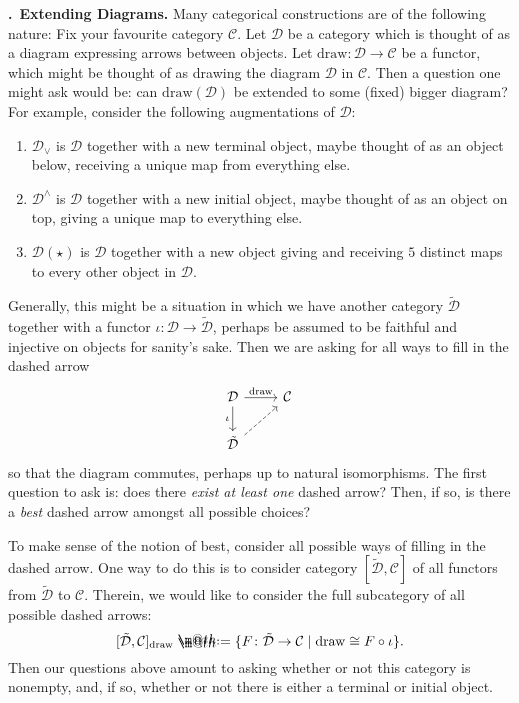 \documentclass[11pt, noamsfonts]{amsart}
\makeatletter
\newcommand{\pointheader}{\vspace{2mm}\noindent\refstepcounter{section}\textbf{\thesection.}}
\newcommand{\bpoint}[1]{\pointheader~{\bf #1.}}
\newcommand*{\coloneqq}{\mathrel{\rlap{%
           \raisebox{0.3ex}{$\m@th\cdot$}}%
           \raisebox{-0.3ex}{$\m@th\cdot$}}%
           =}
\makeatother
\begin{document}
\bpoint{Extending Diagrams}
Many categorical constructions are of the following nature: Fix your favourite
category \(\mathcal{C}\). Let \(\mathcal{D}\) be a category which is thought
of as a diagram expressing arrows between objects. Let
\(\mathrm{draw} \colon \mathcal{D} \to \mathcal{C}\) be a functor, which might
be thought of as drawing the diagram \(\mathcal{D}\) in \(\mathcal{C}\). Then
a question one might ask would be: can \(\mathrm{draw}(\mathcal{D})\) be
extended to some (fixed) bigger diagram? For example, consider the following
augmentations of \(\mathcal{D}\):
\begin{enumerate}
\item \(\mathcal{D}_\vee\) is \(\mathcal{D}\) together with a new terminal
object, maybe thought of as an object below, receiving a unique map from everything else.
\item \(\mathcal{D}^\wedge\) is \(\mathcal{D}\) together with a new initial
object, maybe thought of as an object on top, giving a unique map to everything else.
\item \(\mathcal{D}(\star)\) is \(\mathcal{D}\) together with a new object
giving and receiving \(5\) distinct maps to every other object in \(\mathcal{D}\).
\end{enumerate}
Generally, this might be a situation in which we have another category
\(\tilde{\mathcal{D}}\) together with a functor
\(\iota \colon \mathcal{D} \to \tilde{\mathcal{D}}\), perhaps be assumed to be
faithful and injective on objects for sanity's sake. Then we are asking for all
ways to fill in the dashed arrow
\[
\begin{tikzcd}
\mathcal{D} \rar["\mathrm{draw}"] \dar["\iota"'] & \mathcal{C} \\
\tilde{\mathcal{D}} \ar[dashed,ur]
\end{tikzcd}
\]
so that the diagram commutes, perhaps up to natural isomorphisms. The first
question to ask is: does there \emph{exist at least one} dashed arrow? Then, if
so, is there a \emph{best} dashed arrow amongst all possible choices?

To make sense of the notion of best, consider all possible ways of filling
in the dashed arrow. One way to do this is to consider category
\([\tilde{\mathcal{D}}, \mathcal{C}]\) of all functors from \(\tilde{\mathcal{D}}\)
to \(\mathcal{C}\). Therein, we would like to consider the full subcategory of
all possible dashed arrows:
\[
[\tilde{\mathcal{D}}, \mathcal{C}]_{\mathrm{draw}} \coloneqq
\{F \colon \tilde{\mathcal{D}} \to \mathcal{C} \mid \mathrm{draw} \cong F \circ \iota\}.
\]
Then our questions above amount to asking whether or not this category is
nonempty, and, if so, whether or not there is either a terminal or initial
object.
\end{document}
